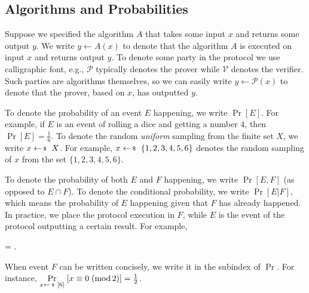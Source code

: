 \documentclass[../../book.tex]{subfiles}
\begin{document}
\subsection{Algorithms and Probabilities}

Suppose we specified the algorithm $A$ that takes some input $x$ and returns
some output $y$. We write $y \gets A(x)$ to denote that the algorithm $A$ is
executed on input $x$ and returns output $y$. To denote some party in the 
protocol we use calligraphic font, e.g., $\mathcal{P}$ typically denotes 
the prover while $\mathcal{V}$ denotes the verifier. Such parties are algorithms 
themselves, so we can easily write $y \gets \mathcal{P}(x)$ to denote that 
the prover, based on $x$, has outputted $y$.

To denote the probability of an event $E$ happening, we write $\Pr[E]$. For
example, if $E$ is an event of rolling a dice and getting a number $4$, then
$\Pr[E] = \frac{1}{6}$. To denote the random \textit{uniform} sampling from the finite set $X$,
we write $x \leftarrowS X$. For example, $x \leftarrowS \{1,2,3,4,5,6\}$
denotes the random sampling of $x$ from the set $\{1,2,3,4,5,6\}$.

To denote the probability of both $E$ and $F$ happening, we write $\Pr[E,F]$ (as
opposed to $E \cap F$). To denote the conditional probability, we write
$\Pr[E|F]$, which means the probability of $E$ happening given that $F$ has
already happened. In practice, we place the protocol execution in $F$, while $E$
is the event of the protocol outputting a certain result. For example,
\begin{xequation}
    \Pr{} = .
\end{xequation}

When event $F$ can be written concisely, we write it in the subindex of $\Pr$.
For instance, $\underset{x \leftarrowS [6]}{\Pr}[x \equiv 0 \; (\text{mod}\,2)]=\frac{1}{2}$.
\end{document}
